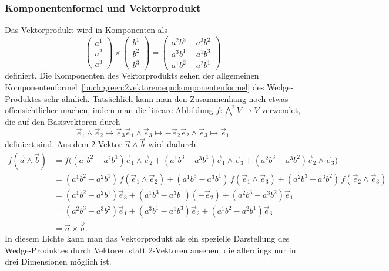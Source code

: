 %
%
\subsubsection{Komponentenformel und Vektorprodukt}
Das Vektorprodukt wird in Komponenten als
%
\[
\begin{pmatrix} a^1 \\ a^2 \\ a^3 \end{pmatrix}
\times
\begin{pmatrix} b^1 \\ b^2 \\ b^3 \end{pmatrix}
=
\begin{pmatrix} a^2b^3-a^3b^2 \\ a^3b^1-a^1b^3 \\ a^1b^2-a^2b^1 \end{pmatrix}
\]
definiert.
Die Komponenten des Vektorprodukts sehen der allgemeinen
Komponentenformel~\eqref{buch:green:2vektoren:eqn:komponentenformel}
des Wedge-Produktes sehr ähnlich.
Tatsächlich kann man den Zusammenhang noch etwas offensichtlicher
machen, indem man die lineare Abbildung $f:\bigwedge^2V\to V$
verwendet, die auf den Basisvektoren durch
\[
\vec{e}_1\wedge\vec{e}_2 \mapsto \vec{e}_3
\vec{e}_1\wedge\vec{e}_3 \mapsto -\vec{e}_2
\vec{e}_2\wedge\vec{e}_3 \mapsto \vec{e}_1
\]
definiert sind.
Aus dem 2-Vektor $\vec{a}\wedge\vec{b}$ wird dadurch
\begin{align*}
f(\vec{a}\wedge\vec{b})
&=
f\bigl((a^1b^2-a^2b^1)\vec{e}_1\wedge\vec{e}_2
      +(a^1b^3-a^3b^1)\vec{e}_1\wedge\vec{e}_3
      +(a^2b^3-a^3b^2)\vec{e}_2\wedge\vec{e}_3\bigr)
\\
&=
(a^1b^2-a^2b^1)\,f(\vec{e}_1\wedge\vec{e}_2)
+(a^1b^3-a^3b^1)\,f(\vec{e}_1\wedge\vec{e}_3)
+(a^2b^3-a^3b^2)\,f(\vec{e}_2\wedge\vec{e}_3)
\\
&=
(a^1b^2-a^2b^1) \vec{e}_3
+(a^1b^3-a^3b^1) (-\vec{e}_2)
+(a^2b^3-a^3b^2) \vec{e}_1
\\
&=
(a^2b^3-a^3b^2) \vec{e}_1
+(a^3b^1-a^1b^3) \vec{e}_2
+(a^1b^2-a^2b^1) \vec{e}_3
\\
&=
\vec{a}\times\vec{b}.
\end{align*}
In diesem Lichte kann man das Vektorprodukt als ein spezielle Darstellung
des Wedge-Produktes durch Vektoren statt 2-Vektoren ansehen, die allerdings
nur in drei Dimensionen möglich ist.

%
%
